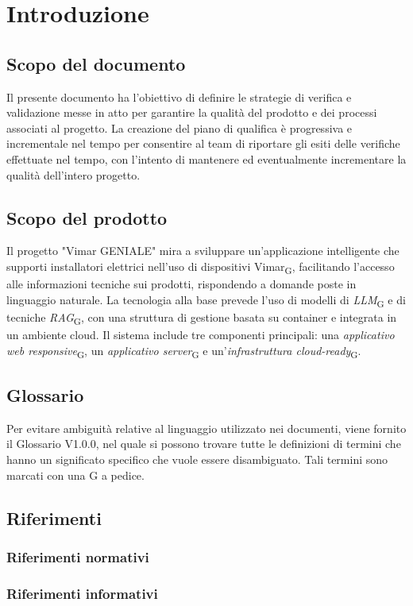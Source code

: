 \section{Introduzione}
\subsection{Scopo del documento}
Il presente documento ha l'obiettivo di definire le strategie di verifica e validazione messe in atto per garantire la qualità del prodotto e dei processi associati al progetto. La creazione del piano di qualifica è progressiva e incrementale nel tempo
per consentire al team di riportare gli esiti delle verifiche effettuate nel tempo, con l'intento di mantenere ed eventualmente incrementare la qualità dell'intero progetto.
\subsection{Scopo del prodotto}
Il progetto "Vimar GENIALE" mira a sviluppare un'applicazione intelligente che supporti installatori elettrici nell'uso di dispositivi Vimar\textsubscript{G}, facilitando l'accesso alle informazioni tecniche sui prodotti, rispondendo a domande poste in linguaggio naturale.
La tecnologia alla base prevede l'uso di modelli di \textit{LLM}\textsubscript{G} e di tecniche \textit{RAG}\textsubscript{G}, con una struttura di gestione basata su container e integrata in un ambiente cloud.
Il sistema include tre componenti principali: una \textit{applicativo web responsive}\textsubscript{G}, un \textit{applicativo server}\textsubscript{G} e un'\textit{infrastruttura cloud-ready}\textsubscript{G}. 
\subsection{Glossario}
Per evitare ambiguità relative al linguaggio utilizzato nei documenti, viene fornito il Glossario V1.0.0, nel quale si possono trovare tutte le definizioni di termini che hanno un significato specifico che vuole essere disambiguato. Tali termini sono marcati con una G a pedice.
\subsection{Riferimenti}
\subsubsection{Riferimenti normativi}
\subsubsection{Riferimenti informativi}
